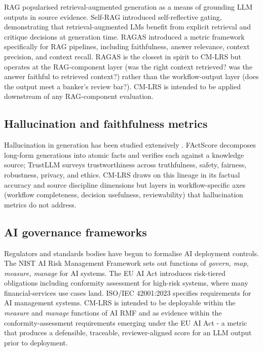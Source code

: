 \documentclass[11pt]{article}
\begin{document}
RAG \citep{lewis2020rag} popularised retrieval-augmented generation as a means of grounding LLM outputs in source evidence. Self-RAG \citep{asai2023selfrag} introduced self-reflective gating, demonstrating that retrieval-augmented LMs benefit from explicit retrieval and critique decisions at generation time. RAGAS \citep{es2023ragas} introduced a metric framework specifically for RAG pipelines, including faithfulness, answer relevance, context precision, and context recall. RAGAS is the closest in spirit to CM-LRS but operates at the RAG-component layer (was the right context retrieved? was the answer faithful to retrieved context?) rather than the workflow-output layer (does the output meet a banker's review bar?). CM-LRS is intended to be applied downstream of any RAG-component evaluation.

\subsection{Hallucination and faithfulness metrics}

Hallucination in generation has been studied extensively \citep{ji2023survey,maynez2020faithfulness}. FActScore \citep{min2023factscore} decomposes long-form generations into atomic facts and verifies each against a knowledge source; TrustLLM \citep{sun2024trustllm} surveys trustworthiness across truthfulness, safety, fairness, robustness, privacy, and ethics. CM-LRS draws on this lineage in its factual accuracy and source discipline dimensions but layers in workflow-specific axes (workflow completeness, decision usefulness, reviewability) that hallucination metrics do not address.

\subsection{AI governance frameworks}

Regulators and standards bodies have begun to formalise AI deployment controls. The NIST AI Risk Management Framework \citep{nistairmf2023} sets out functions of \emph{govern, map, measure, manage} for AI systems. The EU AI Act \citep{euaiact2024} introduces risk-tiered obligations including conformity assessment for high-risk systems, where many financial-services use cases land. ISO/IEC 42001:2023 \citep{iso420012023} specifies requirements for AI management systems. CM-LRS is intended to be deployable within the \emph{measure} and \emph{manage} functions of AI RMF and as evidence within the conformity-assessment requirements emerging under the EU AI Act - a metric that produces a defensible, traceable, reviewer-aligned score for an LLM output prior to deployment.
\end{document}
